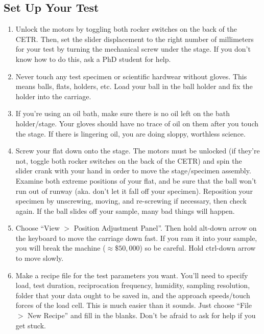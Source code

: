 \documentclass[10pt, letterpaper]{article}
\begin{document}
\subsection{Set Up Your Test}
\begin{enumerate}
\item Unlock the motors by toggling both rocker switches on the back of the CETR. Then, set the slider displacement to the right number of millimeters for your test by turning the mechanical screw under the stage. If you don't know how to do this, ask a PhD student for help.

\item Never touch any test specimen or scientific hardwear without gloves. This means balls, flats, holders, etc. Load your ball in the ball holder and fix the holder into the carriage. 

\item If you're using an oil bath, make sure there is no oil left on the bath holder/stage. Your gloves should have no trace of oil on them after you touch the stage. If there is lingering oil, you are doing sloppy, worthless science.

\item Screw your flat down onto the stage. The motors must be unlocked (if they're not, toggle both rocker switches on the back of the CETR) and spin the slider crank with your hand in order to move the stage/specimen assembly. Examine both extreme positions of your flat, and be sure that the ball won't run out of runway (aka. don't let it fall off your specimen). Reposition your specimen by unscrewing, moving, and re-screwing if necessary, then check again. If the ball slides off your sample, many bad things will happen.

\item Choose ``View $>$ Position Adjustment Panel''. Then hold alt-down arrow on the keyboard to move the carriage down fast. If you ram it into your sample, you will break the machine ($\approx \$50,000$) so be careful. Hold ctrl-down arrow to move slowly.

\item Make a recipe file for the test parameters you want. You'll need to specify load, test duration, reciprocation frequency, humidity, sampling resolution, folder that your data ought to be saved in, and the approach speeds/touch forces of the load cell. This is much easier than it sounds. Just choose ``File $>$ New Recipe'' and fill in the blanks. Don't be afraid to ask for help if you get stuck.
\end{enumerate}
\end{document}
